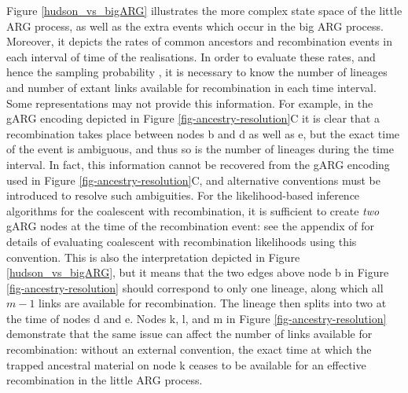 \documentclass{article}
\begin{document}
Figure \ref{hudson_vs_bigARG} illustrates the more complex state space
of the little ARG process, as well as the extra events which occur in the big ARG process.
Moreover, it depicts the rates of common ancestors and recombination events in each
interval of time of the realisations.
In order to evaluate these rates, and hence the sampling probability
\cite[see e.g.][Equation (3)]{mahmoudi2022bayesian},
it is necessary to know the number of lineages and number of extant links
available for recombination in each time interval.
Some representations may not provide this information.
For example, in the gARG encoding depicted in Figure \ref{fig-ancestry-resolution}C
it is clear that a recombination takes place between nodes \textsf{b} and
\textsf{d} as well as \textsf{e}, but the exact time of the event is ambiguous,
and thus so is the number of lineages during the time interval. In fact, this
information cannot be recovered from the gARG encoding used in Figure \ref{fig-ancestry-resolution}C,
and alternative conventions must be introduced to resolve such ambiguities.
For the likelihood-based inference algorithms for the coalescent with recombination,
it is sufficient to create \emph{two} gARG nodes at the time of the recombination event:
see the appendix of \cite{baumdicker2021efficient} for details of evaluating
coalescent with recombination likelihoods using this convention.
This is also the interpretation depicted in
Figure \ref{hudson_vs_bigARG}, but it means that the two edges above node \textsf{b}
in Figure \ref{fig-ancestry-resolution} should correspond to only one lineage,
along which all $m-1$ links are available for recombination.
The lineage then splits into two at the time of nodes \textsf{d} and \textsf{e}.
Nodes \textsf{k}, \textsf{l}, and \textsf{m} in Figure \ref{fig-ancestry-resolution}
demonstrate that the same issue can affect the number of links available for recombination:
without an external convention, the exact time at which the trapped ancestral material on
node \textsf{k} ceases to be available for an effective recombination in the little ARG process.
\end{document}
